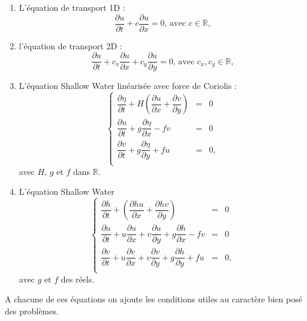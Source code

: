 \begin{enumerate}
\item L'équation de transport 1D :
\begin{equation}
\dfrac{\partial u}{\partial t} + c \dfrac{\partial u}{\partial x} = 0 \text{, avec } c \in \mathbb{R},
\end{equation} 

\item l'équation de transport 2D :
\begin{equation}
\dfrac{\partial u}{\partial t} + c_x \dfrac{\partial u}{\partial x} + c_y \dfrac{\partial u}{\partial y} = 0 \text{, avec } c_x, c_y \in \mathbb{R},
\end{equation} 

\item L'équation Shallow Water linéarisée avec force de Coriolis :
\begin{equation}
\left\lbrace
\begin{array}{rcl}
\dfrac{\partial \eta}{\partial t} + H \left( \dfrac{\partial u}{\partial x} + \dfrac{\partial v}{\partial y} \right) & = & 0 \\
\dfrac{\partial u}{\partial t} + g \dfrac{\partial \eta}{\partial x} - f v & = & 0 \\
\dfrac{\partial v}{\partial t} + g \dfrac{\partial \eta}{\partial y} + f u & = & 0, \\
\end{array}
\right.
\end{equation}
avec $H$, $g$ et $f$ dans $\mathbb{R}$.
\item L'équation Shallow Water
\begin{equation}
\left\lbrace
\begin{array}{rcl}
\dfrac{\partial h}{\partial t} + \left( \dfrac{\partial hu}{\partial x} + \dfrac{\partial hv}{\partial y} \right) & = & 0 \\
\dfrac{\partial u}{\partial t} + u \dfrac{\partial u}{\partial x} + v\dfrac{\partial u}{\partial y} + g \dfrac{\partial h}{\partial x} - f v & = & 0 \\
\dfrac{\partial v}{\partial t} + u \dfrac{\partial v}{\partial x} + v\dfrac{\partial v}{\partial y} + g \dfrac{\partial h}{\partial y} + f u & = & 0, \\
\end{array}
\right.
\end{equation}
avec $g$ et $f$ des réels.
\end{enumerate}
A chacune de ces équations on ajoute les conditions utiles au caractère bien posé des problèmes.

